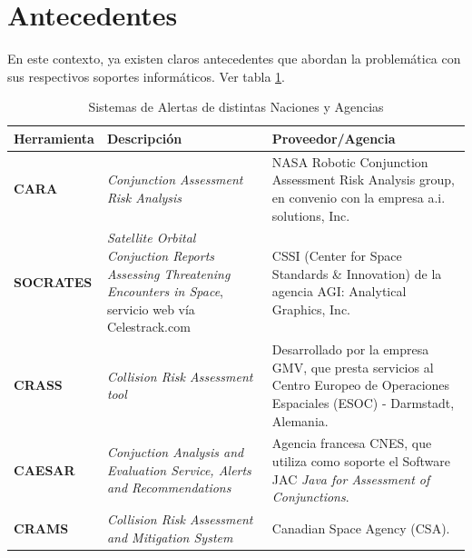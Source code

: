 \section{Antecedentes}
En este contexto, ya existen claros antecedentes que abordan la problem\'atica con sus respectivos soportes inform\'aticos. Ver tabla \ref{tab:sisal}.
\begin{table}[!h]
\centering
\begin{tabular}{|l|p{5cm}|p{6cm}|}
\hline
Herramienta & Descripci\'on & Proveedor/Agencia\\
\hline
{\bf{CARA}} & {\it{Conjunction Assessment Risk Analysis}} & NASA Robotic Conjunction Assessment Risk Analysis group, en convenio con la empresa a.i. solutions, Inc.\\
\hline
{\bf{SOCRATES}} & {\it{Satellite Orbital Conjuction Reports Assessing Threatening Encounters in Space}}, servicio web v\'ia Celestrack.com & CSSI (Center for Space Standards \& Innovation) de la agencia AGI: Analytical Graphics, Inc.\\
\hline
{\bf{CRASS}} & {\it{Collision Risk Assessment tool}} & Desarrollado por la
empresa GMV, que presta servicios al Centro Europeo de Operaciones
Espaciales (ESOC) - Darmstadt, Alemania. \cite{alarconRodriguez}\\
\hline
{\bf{CAESAR}} & {\it{Conjuction Analysis and Evaluation Service, Alerts and Recommendations}} & Agencia francesa CNES, que utiliza como soporte el Software JAC {\it{Java for Assessment of Conjunctions}}. \cite{laporte}\\
\hline
{\bf{CRAMS}} & {\it{Collision Risk Assessment and Mitigation System}} & Canadian Space Agency (CSA). \cite{babiker}\\
\hline
\end{tabular}
\caption[Sistemas de Alerta]{Sistemas de Alertas de distintas Naciones y Agencias}
\label{tab:sisal}
\end{table}

